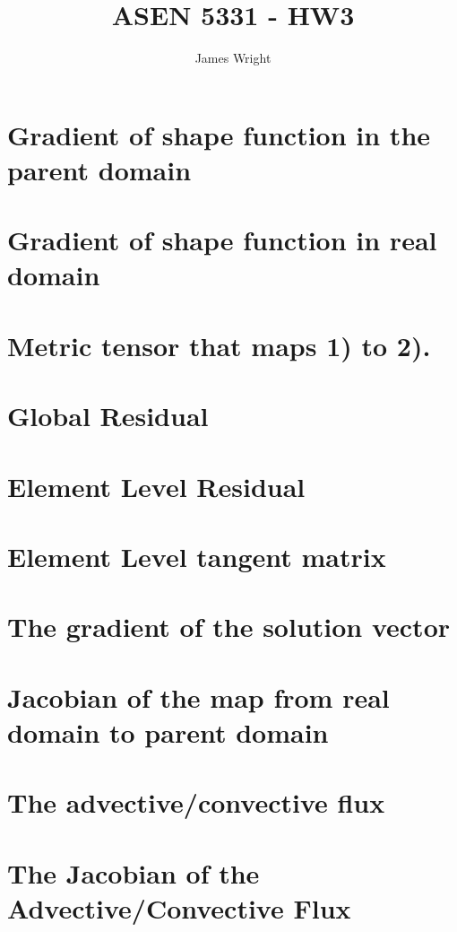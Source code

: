 \documentclass[12pt, letterpaper, twoside]{article}
\title{ASEN 5331 - HW3}
\author{James Wright}
\newcommand{\0}{\vec{0}}
\begin{document}
\maketitle

\section{Gradient of shape function in the parent domain}

\section{Gradient of shape function in real domain}

\section{Metric tensor that maps 1) to 2).}

\section{Global Residual}

\section{Element Level Residual}

\section{Element Level tangent matrix}

\section{The gradient of the solution vector}

\section{Jacobian of the map from real domain to parent domain}

\section{The advective/convective flux}

\section{The Jacobian of the Advective/Convective Flux}
\end{document}
